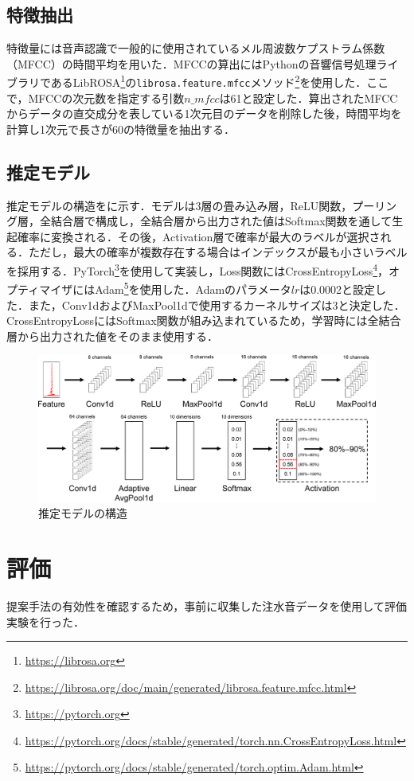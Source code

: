 \documentclass[submit,techrep,noauthor]{ipsj}
\begin{document}
\subsection{特徴抽出}
特徴量には音声認識で一般的に使用されているメル周波数ケプストラム係数（MFCC）の時間平均を用いた．MFCCの算出にはPythonの音響信号処理ライブラリであるLibROSA\footnote{\url{https://librosa.org}}の\texttt{librosa.feature.mfcc}メソッド\footnote{\url{https://librosa.org/doc/main/generated/librosa.feature.mfcc.html}}を使用した．ここで，MFCCの次元数を指定する引数$n\_mfcc$は61と設定した．算出されたMFCCからデータの直交成分を表している1次元目のデータを削除した後，時間平均を計算し1次元で長さが60の特徴量を抽出する．


\subsection{推定モデル}
推定モデルの構造をに示す．モデルは3層の畳み込み層，ReLU関数，プーリング層，全結合層で構成し，全結合層から出力された値はSoftmax関数を通して生起確率に変換される．その後，Activation層で確率が最大のラベルが選択される．ただし，最大の確率が複数存在する場合はインデックスが最も小さいラベルを採用する．PyTorch\footnote{\url{https://pytorch.org}}を使用して実装し，Loss関数にはCrossEntropyLoss\footnote{\url{https://pytorch.org/docs/stable/generated/torch.nn.CrossEntropyLoss.html}}，オプティマイザにはAdam\footnote{\url{https://pytorch.org/docs/stable/generated/torch.optim.Adam.html}}を使用した．Adamのパラメータ$lr$は0.0002と設定した．また，Conv1dおよびMaxPool1dで使用するカーネルサイズは3と決定した．CrossEntropyLossにはSoftmax関数が組み込まれているため，学習時には全結合層から出力された値をそのまま使用する．

\begin{figure}[!t]
  \centering
  \includegraphics[width=0.8\linewidth]{figures/model.eps}
  \caption{推定モデルの構造}
  \label{fig:model}
\end{figure}



\section{評価}
\label{sec:evaluation}
提案手法の有効性を確認するため，事前に収集した注水音データを使用して評価実験を行った．
\end{document}
